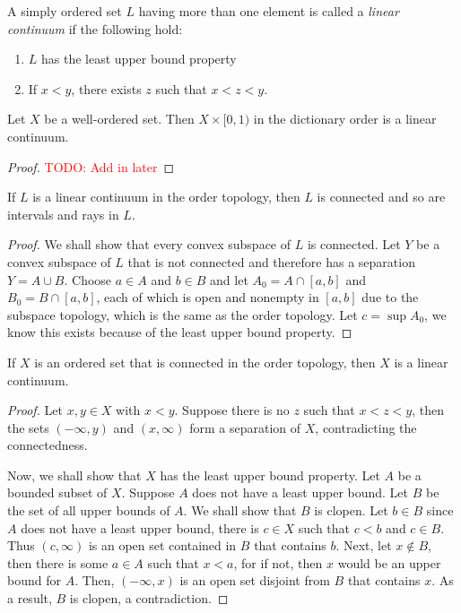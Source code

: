 \begin{definition}
    A simply ordered set $L$ having more than one element is called a \textit{linear continuum} if the following hold:
    \begin{enumerate}
        \item $L$ has the least upper bound property 
        \item If $x < y$, there exists $z$ such that $x < z < y$.
    \end{enumerate}
\end{definition}

\begin{proposition}
    Let $X$ be a well-ordered set. Then $X\times[0,1)$ in the dictionary order is a linear continuum.
\end{proposition}
\begin{proof}
    \textcolor{red}{TODO: Add in later}
\end{proof}

\begin{theorem}
    If $L$ is a linear continuum in the order topology, then $L$ is connected and so are intervals and rays in $L$.
\end{theorem}
\begin{proof}
    We shall show that every convex subspace of $L$ is connected. Let $Y$ be a convex subspace of $L$ that is not connected and therefore has a separation $Y = A\cup B$. Choose $a\in A$ and $b\in B$ and let $A_0 = A\cap[a,b]$ and $B_0 = B\cap[a,b]$, each of which is open and nonempty in $[a,b]$ due to the subspace topology, which is the same as the order topology. Let $c = \sup A_0$, we know this exists because of the least upper bound property.
\end{proof}

\begin{theorem}
    If $X$ is an ordered set that is connected in the order topology, then $X$ is a linear continuum.
\end{theorem}
\begin{proof}
    Let $x,y\in X$ with $x < y$. Suppose there is no $z$ such that $x < z < y$, then the sets $(-\infty, y)$ and $(x,\infty)$ form a separation of $X$, contradicting the connectedness.

    Now, we shall show that $X$ has the least upper bound property. Let $A$ be a bounded subset of $X$. Suppose $A$ does not have a least upper bound. Let $B$ be the set of all upper bounds of $A$. We shall show that $B$ is clopen. Let $b\in B$ since $A$ does not have a least upper bound, there is $c\in X$ such that $c < b$ and $c\in B$. Thus $(c,\infty)$ is an open set contained in $B$ that contains $b$. Next, let $x\notin B$, then there is some $a\in A$ such that $x < a$, for if not, then $x$ would be an upper bound for $A$. Then, $(-\infty, x)$ is an open set disjoint from $B$ that contains $x$. As a result, $B$ is clopen, a contradiction.
\end{proof}

